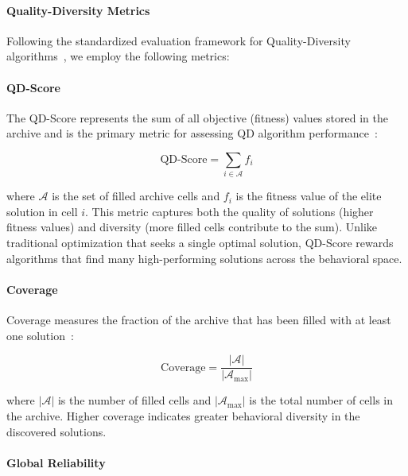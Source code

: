 \paragraph{Quality-Diversity Metrics}
\label{par:qd_metrics}

Following the standardized evaluation framework for Quality-Diversity algorithms~\cite{pugh2016quality,cully2015robots}, we employ the following metrics:

\paragraph{QD-Score}

The QD-Score represents the sum of all objective (fitness) values stored in the archive and is the primary metric for assessing QD algorithm performance~\cite{pugh2016quality}:

\begin{equation}
\text{QD-Score} = \sum_{i \in \mathcal{A}} f_i
\end{equation}

\noindent where $\mathcal{A}$ is the set of filled archive cells and $f_i$ is the fitness value of the elite solution in cell $i$. This metric captures both the quality of solutions (higher fitness values) and diversity (more filled cells contribute to the sum). Unlike traditional optimization that seeks a single optimal solution, QD-Score rewards algorithms that find many high-performing solutions across the behavioral space.

\paragraph{Coverage}

Coverage measures the fraction of the archive that has been filled with at least one solution~\cite{mouret2015illuminating}:

\begin{equation}
\text{Coverage} = \frac{|\mathcal{A}|}{|\mathcal{A}_{\max}|}
\end{equation}

\noindent where $|\mathcal{A}|$ is the number of filled cells and $|\mathcal{A}_{\max}|$ is the total number of cells in the archive. Higher coverage indicates greater behavioral diversity in the discovered solutions.

\paragraph{Global Reliability}

